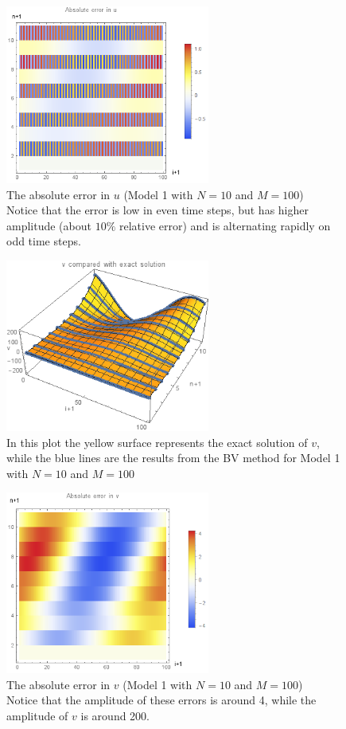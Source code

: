 \documentclass{article}
\renewcommand{\(}{\left(}
\renewcommand{\)}{\right)}
\begin{document}
\begin{figure}
\centering
\includegraphics[width=0.6\textwidth]{errorUneat.png}
\caption{The absolute error in $u$ (Model 1 with $N=10$ and $M=100$)\\Notice that the error is low in even time steps, but has higher amplitude (about $10\%$ relative error) and is alternating rapidly on odd time steps.}
\label{fig:uerr1}
\end{figure}

\begin{figure}
\centering
\includegraphics[width=0.6\textwidth]{vCompared.png}
\caption{In this plot the yellow surface represents the exact solution of $v$, while the blue lines are the results from the BV method for Model 1 with $N=10$ and $M=100$}
\label{fig:vcomp1}
\end{figure}

\begin{figure}
\centering
\includegraphics[width=0.6\textwidth]{errorVneat.png}
\caption{The absolute error in $v$ (Model 1 with $N=10$ and $M=100$)\\Notice that the amplitude of these errors is around 4, while the amplitude of $v$ is around 200. }
\label{fig:verr1}
\end{figure}
\end{document}
